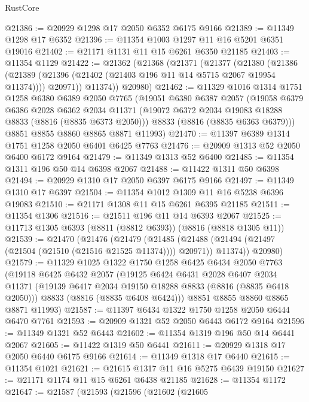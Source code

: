 \begin{lexlean}{RustCore}
\begin{coremodule}
@21386 := @20929 @1298 @17 @2050 @6352 @6175 @9166
@21389 := @11349 @1298 @17 @6352
@21396 := @11354 @1003 @1297 @11 @16 @5201 @6351 @19016
@21402 := @21171 @1131 @11 @15 @6261 @6350 @21185
@21403 := @11354 @1129
@21422 := @21362
    (@21368
      (@21371
        (@21377
          (@21380
            (@21386
              (@21389 (@21396 (@21402 (@21403 @196 @11 @14 @5715 @2067 @19954 @11374))))
              @20971))
          @11374))
      @20980)
@21462 := @11329
    @1016
    @1314
    @1751
    @1258
    @6380
    @6389
    @2050
    @7765
    (@19051
      @6380
      @6387
      @2057
      (@19058
        @6379
        @6386
        @2028
        @6362
        @2034
        @11371
        (@19072 @6372 @2034 @19083 @18288 @8833 (@8816 (@8835 @6373 @2050)))
        @8833
        (@8816 (@8835 @6363 @6379)))
      @8851
      @8855
      @8860
      @8865
      @8871
      @11993)
@21470 := @11397 @6389 @1314 @1751 @1258 @2050 @6401 @6425 @7763
@21476 := @20909 @1313 @52 @2050 @6400 @6172 @9164
@21479 := @11349 @1313 @52 @6400
@21485 := @11354 @1311 @196 @50 @14 @6398 @2067
@21488 := @11422 @1311 @50 @6398
@21494 := @20929 @1310 @17 @2050 @6397 @6175 @9166
@21497 := @11349 @1310 @17 @6397
@21504 := @11354 @1012 @1309 @11 @16 @5238 @6396 @19083
@21510 := @21171 @1308 @11 @15 @6261 @6395 @21185
@21511 := @11354 @1306
@21516 := @21511 @196 @11 @14 @6393 @2067
@21525 := @11713 @1305 @6393 (@8811 (@8812 @6393)) (@8816 (@8818 @1305 @11))
@21539 := @21470
    (@21476
      (@21479
        (@21485 (@21488 (@21494 (@21497 (@21504 (@21510 (@21516 @21525 @11374)))) @20971)) @11374))
      @20980)
@21579 := @11329
    @1025
    @1322
    @1750
    @1258
    @6425
    @6434
    @2050
    @7763
    (@19118
      @6425
      @6432
      @2057
      (@19125
        @6424
        @6431
        @2028
        @6407
        @2034
        @11371
        (@19139 @6417 @2034 @19150 @18288 @8833 (@8816 (@8835 @6418 @2050)))
        @8833
        (@8816 (@8835 @6408 @6424)))
      @8851
      @8855
      @8860
      @8865
      @8871
      @11993)
@21587 := @11397 @6434 @1322 @1750 @1258 @2050 @6444 @6470 @7761
@21593 := @20909 @1321 @52 @2050 @6443 @6172 @9164
@21596 := @11349 @1321 @52 @6443
@21602 := @11354 @1319 @196 @50 @14 @6441 @2067
@21605 := @11422 @1319 @50 @6441
@21611 := @20929 @1318 @17 @2050 @6440 @6175 @9166
@21614 := @11349 @1318 @17 @6440
@21615 := @11354 @1021
@21621 := @21615 @1317 @11 @16 @5275 @6439 @19150
@21627 := @21171 @1174 @11 @15 @6261 @6438 @21185
@21628 := @11354 @1172
@21647 := @21587
    (@21593
      (@21596
        (@21602
          (@21605

\end{coremodule}
\end{lexlean}
